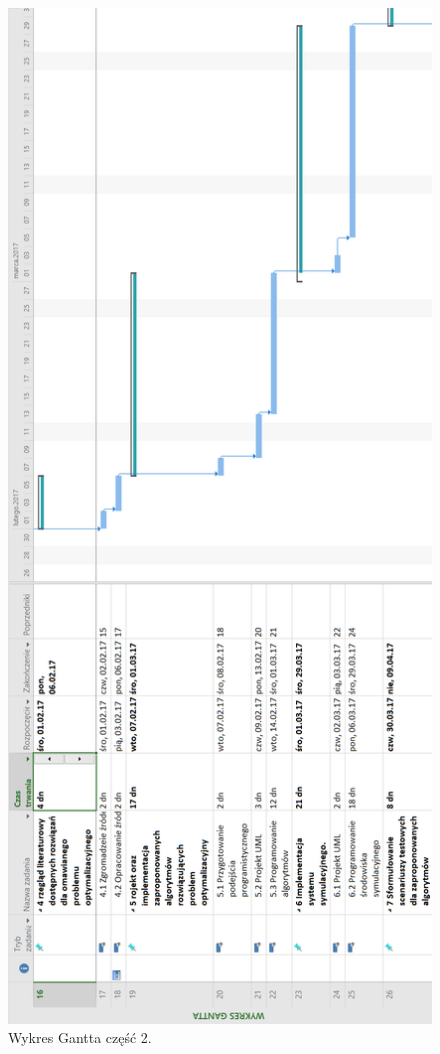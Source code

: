 \documentclass[12pt]{article} %
\begin{document}
\begin{figure}[H]
  \centering
  \includegraphics[scale=0.5]{images/g2.png}
  \caption{Wykres Gantta część 2.}
\end{figure}
\end{document}
